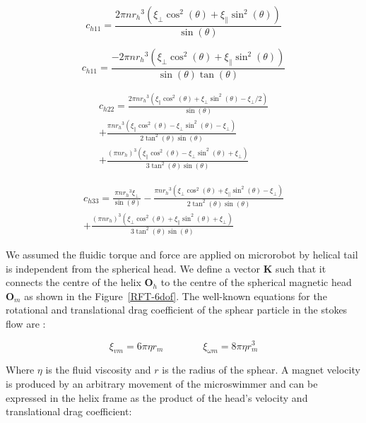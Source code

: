 \documentclass[12pt,a4paper,titlepage]{report}
\begin{document}
\begin{equation}
c_{h11} = \frac{2\pi n {r_h}^3 (\xi_{\perp} \cos^2(\theta) + \xi_{\parallel} \sin^2(\theta))}{\sin(\theta) }
\label{ch11}
\end{equation} 


\begin{equation}
c_{h11} = \frac{-2\pi n {r_h}^3 (\xi_{\perp} \cos^2(\theta) + \xi_{\parallel} \sin^2(\theta))}{\sin(\theta) \tan(\theta)}
\label{ch13}
\end{equation}


\begin{multline}
c_{h22} = \frac{2\pi n {r_h}^3 (\xi_{\parallel} \cos^2(\theta) + \xi_{\perp} \sin^2(\theta) - \xi_{\perp}/2)}{\sin(\theta) } \\
+ \frac{\pi n {r_h}^3 (\xi_{\parallel} \cos^2(\theta) - \xi_{\perp} \sin^2(\theta) - \xi_{\perp})}{2{\tan^2(\theta)}\sin(\theta)}\\
+ \frac{(\pi n {r_h})^3 (\xi_{\parallel} \cos^2(\theta) - \xi_{\perp} \sin^2(\theta) + \xi_{\perp})}{3{\tan^2(\theta)}\sin(\theta)}
\label{ch22}
\end{multline}



\begin{multline}
c_{h33} = \frac{\pi n {r_h}^3 \xi_{\perp} }{\sin(\theta) }- \frac{\pi n {r_h}^3 (\xi_{\perp} \cos^2(\theta) + \xi_{\parallel} \sin^2(\theta) - \xi_{\perp})}{2{\tan^2(\theta)}\sin(\theta)}\\
+ \frac{(\pi n {r_h})^3 (\xi_{\perp} \cos^2(\theta) + \xi_{\parallel} \sin^2(\theta) + \xi_{\perp})}{3{\tan^2(\theta)}\sin(\theta)}
\label{ch33}
\end{multline}


We assumed the fluidic torque and force are applied on microrobot by helical tail is independent from the
spherical head. We define a vector $\bm K$ such that it connects the centre of the helix $\bm O_h$ to the 
centre of the spherical magnetic head $\bm O_m$ as shown in the Figure~\ref{RFT-6dof}. The well-known
equations for the rotational and translational drag coefficient of the sphear particle in the stokes flow 
 are \citep{white1991viscous}:


\begin{equation}
\xi_{vm} = 6 \pi \eta r_m \qquad \qquad \xi_{\omega m} = 8 \pi \eta r^3_m
\label{shearical_drag_coefficients}
\end{equation}


Where $\eta$ is the fluid viscosity and $r$ is the radius of the sphear. A magnet velocity is produced by an 
arbitrary movement of the microswimmer and can be expressed in the helix frame as the product of the
head\rq{}s velocity and translational drag coefficient:
\end{document}
